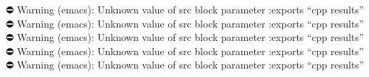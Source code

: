 \documentclass[11pt]{article}
\author{Aiden Thomas}
\date{\today}
\title{}
\begin{document}
\tableofcontents

⛔ Warning (emacs): Unknown value of src block parameter :exports ``cpp results''
⛔ Warning (emacs): Unknown value of src block parameter :exports ``cpp results''
⛔ Warning (emacs): Unknown value of src block parameter :exports ``cpp results''
⛔ Warning (emacs): Unknown value of src block parameter :exports ``cpp results''
⛔ Warning (emacs): Unknown value of src block parameter :exports ``cpp results''
\end{document}
